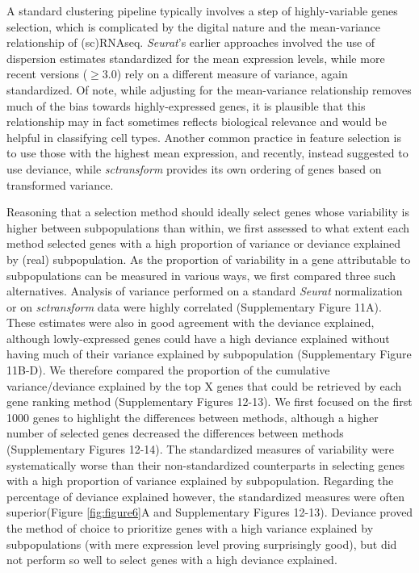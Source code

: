 \documentclass{bmcart}
\begin{document}
A standard clustering pipeline typically involves a step of highly-variable genes selection, which is complicated by the digital nature and the mean-variance relationship of (sc)RNAseq. \textit{Seurat}'s earlier approaches involved the use of dispersion estimates standardized for the mean expression levels, while more recent versions ($\geq$3.0) rely on a different measure of variance, again standardized. Of note, while adjusting for the mean-variance relationship removes much of the bias towards highly-expressed genes, it is plausible that this relationship may in fact sometimes reflects biological relevance and would be helpful in classifying cell types. Another common practice in feature selection is to use those with the highest mean expression, and recently, \citep{townesGlmpca2019} instead suggested to use deviance, while \textit{sctransform} provides its own ordering of genes based on transformed variance.

Reasoning that a selection method should ideally select genes whose variability is higher between subpopulations than within, we first assessed to what extent each method selected genes with a high proportion of variance or deviance explained by (real) subpopulation. As the proportion of variability in a gene attributable to subpopulations can be measured in various ways, we first compared three such alternatives. Analysis of variance performed on a standard \textit{Seurat} normalization or on \textit{sctransform} data were highly correlated (Supplementary Figure 11A). These estimates were also in good agreement with the deviance explained, although lowly-expressed genes could have a high deviance explained without having much of their variance explained by subpopulation (Supplementary Figure 11B-D). We therefore compared the proportion of the cumulative variance/deviance explained by the top X genes that could be retrieved by each gene ranking method (Supplementary Figures 12-13). We first focused on the first 1000 genes to highlight the differences between methods, although a higher number of selected genes decreased the differences between methods (Supplementary Figures 12-14). The standardized measures of variability were systematically worse than their non-standardized counterparts in selecting genes with a high proportion of variance explained by subpopulation. Regarding the percentage of deviance explained however, the standardized measures were often superior(Figure \ref{fig:figure6}A and Supplementary Figures 12-13). Deviance proved the method of choice to prioritize genes with a high variance explained by subpopulations (with mere expression level proving surprisingly good), but did not perform so well to select genes with a high deviance explained.
\end{document}
